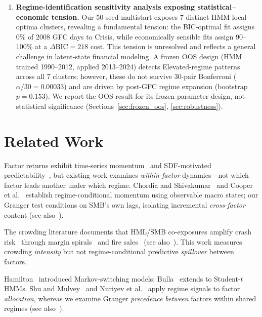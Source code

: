 \documentclass[sigconf,anonymous]{acmart}
\begin{document}
\begin{enumerate}
    \item \textbf{Regime-identification sensitivity analysis exposing statistical--economic tension.}
    Our 50-seed multistart exposes 7 distinct HMM local-optima clusters,
    revealing a fundamental tension: the BIC-optimal fit assigns 0\% of
    2008 GFC days to Crisis, while economically sensible fits assign
    90--100\% at a $\Delta\text{BIC} = 218$ cost. This tension is
    unresolved and reflects a general challenge in latent-state
    financial modeling. A frozen OOS design (HMM trained 1990--2012,
    applied 2013--2024) detects Elevated-regime patterns across all
    7 clusters; however, these do not survive 30-pair Bonferroni
    ($\alpha/30 = 0.00033$) and are driven by post-GFC regime expansion
    (bootstrap $p = 0.153$). We report the OOS result for its
    frozen-parameter design, not statistical significance
    (Sections~\ref{sec:frozen_oos}, \ref{sec:robustness}).
\end{enumerate}

\section{Related Work}

Factor returns exhibit time-series momentum~\cite{ehsani2022factor,gupta2019factor}
and SDF-motivated predictability~\cite{haddad2020factor}, but existing work examines
\emph{within-factor} dynamics---not which factor leads another under which regime.
Chordia and Shivakumar~\cite{chordia2002momentum} and Cooper et al.~\cite{cooper2004market}
establish regime-conditional momentum using observable macro states; our Granger test
conditions on SMB's own lags, isolating incremental \emph{cross-factor} content
(see also~\cite{fama1993common,fama2015five,barroso2015momentum,daniel2016momentum,asness2013value}).

The crowding literature documents that HML/SMB co-exposures amplify crash
risk~\cite{marks2019factor,chincarini2026crowded,betermier2025investor} through
margin spirals~\cite{brunnermeier2009market} and fire
sales~\cite{shleifer1997limits,coval2007asset}
(see also~\cite{anton2014connected,lou2022comomentum,greenwood2011stock}).
This work measures crowding \emph{intensity} but not regime-conditional
predictive \emph{spillover} between factors.

Hamilton~\cite{hamilton1989new} introduced Markov-switching models;
Bulla~\cite{bulla2011hidden} extends to Student-$t$ HMMs.
Shu and Mulvey~\cite{shu2025dynamic} and Nuriyev et al.~\cite{nuriyev2024regime}
apply regime signals to factor \emph{allocation}, whereas we examine Granger
\emph{precedence between} factors within shared regimes
(see also~\cite{krolzig1997markov,chincoli2017linear,ang2002regime,guidolin2007asset,oelschlager2024fhmm}).
\end{document}
